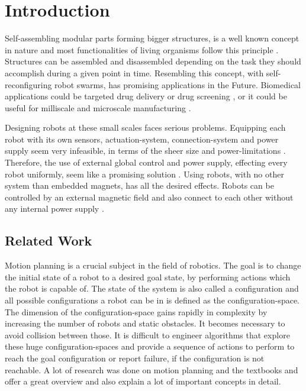 \chapter{Introduction}

Self-assembling modular parts forming bigger structures, is a well known concept in nature and most functionalities of living organisms follow this principle \cite{bishop2005}.
Structures can be assembled and disassembled depending on the task they should accomplish during a given point in time. 
Resembling this concept, with self-reconfiguring robot swarms, has promising applications in the Future.
Biomedical applications could be targeted drug delivery or drug screening \cite{sitti2015}, or it could be useful for milliscale and microscale manufacturing \cite{pelrine2016}.

Designing robots at these small scales faces serious problems.
Equipping each robot with its own sensors, actuation-system, connection-system and power supply seem very infeasible, in terms of the sheer size and power-limitations \cite{white2007}.
Therefore, the use of external global control and power supply, effecting every robot uniformly, seem like a promising solution \cite{white2007}.
Using robots, with no other system than embedded magnets, has all the desired effects.
Robots can be controlled by an external magnetic field and also connect to each other without any internal power supply \cite{saab2019}.


\section{Related Work}

Motion planning is a crucial subject in the field of robotics.
The goal is to change the initial state of a robot to a desired goal state, by performing actions which the robot is capable of.
The state of the system is also called a configuration and all possible configurations a robot can be in is defined as the configuration-space.
The dimension of the configuration-space gains rapidly in complexity by increasing the number of robots and static obstacles.
It becomes necessary to avoid collision between those.
It is difficult to engineer algorithms that explore these huge configuration-spaces and provide a sequence of actions to perform to reach the goal configuration or report failure, if the configuration is not reachable.
A lot of research was done on motion planning and the textbooks \cite{LaValle2006} and \cite{Mueller2019} offer a great overview and also explain a lot of important concepts in detail.

